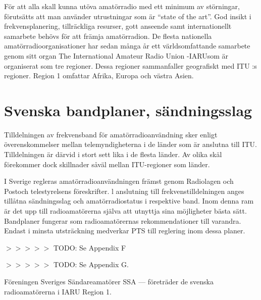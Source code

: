 För att alla skall kunna utöva amatörradio med ett minimum av störningar,
förutsätts att man använder utrustningar som är ``state of the art''.  God
insikt i frekvensplanering, tillräckliga resurser, gott anseende samt
internationellt samarbete behövs för att främja amatörradion. De flesta
nationella amatörradioorganisationer har sedan många år ett världsomfattande
samarbete genom sitt organ The International Amateur Radio Union -IARUsom är
organiserat som tre regioner. Dessa regioner sammanfaller geografiskt med ITU :s
regioner. Region 1 omfattar Afrika, Europa och västra Asien.

\section{Svenska bandplaner, sändningsslag}

Tilldelningen av frekvensband för amatörradioanvändning sker enligt
överenskommelser mellan telemyndigheterna i de länder som är anslutna till
ITU. Tilldelningen är därvid i stort sett lika i de flesta länder. Av olika skäl
förekommer dock skillnader såväl mellan ITU-regioner som länder.

I Sverige regleras amatörradioanvändningen främst genom Radiolagen och Postoch
telestyrelsens föreskrifter. l anslutning till frekvenstilldelningen anges
tillåtna sändningsslag och amatörradiostatus i respektive band. Inom denna ram
är det upp till radioamatörerna själva att utnyttja sina möjligheter bästa sätt.
Bandplaner fungerar som radioamatörernas rekommendationer till varandra. Endast
i minsta utsträckning medverkar PTS till reglering inom dessa planer.

$>>>>>$ TODO: Se Appendix F

$>>>>>$ TODO: Se Appendix G.

Föreningen Sveriges Sändareamatörer SSA --- företräder de svenska
radioamatörerna i IARU Region 1.
